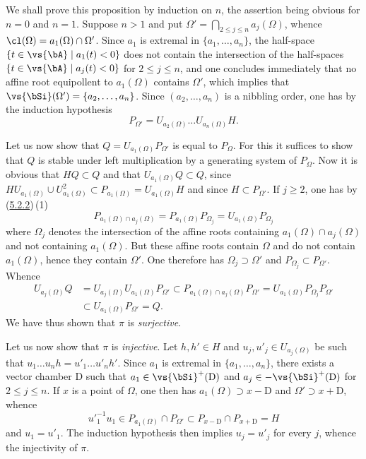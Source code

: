 \documentclass[12pt,a4paper,oneside,english]{smfart}
\makeatletter
\newcommand{\btpageanchor}[1]{\Hy@raisedlink{\hypertarget{p:#1}{}}}
\newcommand{\btref}[1]{\hyperlink{bt:#1}{#1}}
\newcommand{\btpage}[1]{\marginnote{p.~#1}\btpageanchor{#1}}
\newcommand{\pg}[1]{\btpage{#1}}
\theoremstyle{definition}
\theoremstyle{bt}
\makeatother
\begin{document}
We shall prove this proposition by induction on $n$, the assertion being obvious
for $n=0$ and $n=1$. Suppose $n>1$ and put
$\Omega'=\bigcap_{2\leqslant j\leqslant n}a_{j}(\Omega)$, whence
$\cl(\Omega)=a_{1}(\Omega)\cap\Omega'$. Since $a_{1}$ is extremal in
$\{a_{1},\dots,a_{n}\}$, the half-space
$\{t\in\vs{\bA}\mid a_{1}(t)<0\}$ does not contain the intersection of the
half-spaces $\{t\in\vs{\bA}\mid a_{j}(t)<0\}$ for $2\leqslant j\leqslant n$, and
one concludes immediately that no affine root equipollent to $a_{1}(\Omega)$
contains $\Omega'$, which implies that $\vs{\bSi}(\Omega')=\{a_{2},\dots,a_{n}\}$.
Since $(a_{2},\dots,a_{n})$ is a nibbling order, one has by the induction
hypothesis
\[
P_{\Omega'}=U_{a_{2}(\Omega)}\dots U_{a_{n}(\Omega)}H.
\]

Let us now show that $Q=U_{a_{1}(\Omega)}P_{\Omega'}$ is equal to $P_{\Omega}$.
For this it suffices to show that $Q$ is stable under left multiplication by a
generating system of $P_{\Omega}$. Now it is obvious that $HQ\subset Q$ and that
$U_{a_{1}(\Omega)}Q\subset Q$, since
$HU_{a_{1}(\Omega)}\cup U^{2}_{a_{1}(\Omega)}\subset P_{a_{1}(\Omega)}=U_{a_{1}(\Omega)}H$
and since $H\subset P_{\Omega'}$. If $j\geqslant2$, one has by (\btref{5.2.2})\,(1)
\[
P_{a_{1}(\Omega)\cap a_{j}(\Omega)}=P_{a_{1}(\Omega)}P_{\Omega_{j}} =U_{a_{1}(\Omega)}P_{\Omega_{j}}
\]
where $\Omega_{j}$ denotes the intersection of the affine roots containing
$a_{1}(\Omega)\cap a_{j}(\Omega)$ and not containing $a_{1}(\Omega)$. But these
affine roots contain $\Omega$ and do not contain $a_{1}(\Omega)$, hence they
contain $\Omega'$. One therefore has $\Omega_{j}\supset\Omega'$ and
$P_{\Omega_{j}}\subset P_{\Omega'}$. Whence \pg{99}
\begin{align*}
U_{a_{j}(\Omega)}Q&=U_{a_{j}(\Omega)}U_{a_{1}(\Omega)}P_{\Omega'}
\subset P_{a_{1}(\Omega)\cap a_{j}(\Omega)}P_{\Omega'}
=U_{a_{1}(\Omega)}P_{\Omega_{j}}P_{\Omega'}\\
&\subset U_{a_{1}(\Omega)}P_{\Omega'}=Q.
\end{align*}
We have thus shown that $\pi$ is \emph{surjective}.

Let us now show that $\pi$ is \emph{injective}. Let $h,h'\in H$ and
$u_{j},u'_{j}\in U_{a_{j}(\Omega)}$ be such that
$u_{1}\dots u_{n}h=u'_{1}\dots u'_{n}h'$. Since $a_{1}$ is extremal in
$\{a_{1},\dots,a_{n}\}$, there exists a vector chamber $\mathrm{D}$ such that
$a_{1}\in\vs{\bSi}^{+}(\mathrm{D})$ and $a_{j}\in-\vs{\bSi}^{+}(\mathrm{D})$ for
$2\leqslant j\leqslant n$. If $x$ is a point of $\Omega$, one then has
$a_{1}(\Omega)\supset x-\mathrm{D}$ and $\Omega'\supset x+\mathrm{D}$, whence
\[
u'^{-1}_{1}u_{1}\in P_{a_{1}(\Omega)}\cap P_{\Omega'}
\subset P_{x-\mathrm{D}}\cap P_{x+\mathrm{D}}=H
\]
and $u_{1}=u'_{1}$. The induction hypothesis then implies $u_{j}=u'_{j}$ for
every $j$, whence the injectivity of $\pi$.
\end{document}
